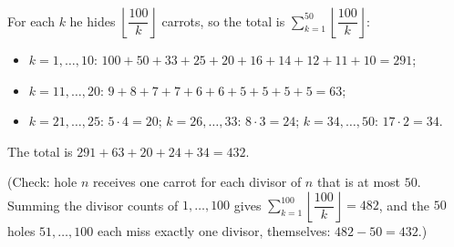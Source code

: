 For each $k$ he hides $\left\lfloor\dfrac{100}{k}\right\rfloor$ carrots, so the total is $\displaystyle\sum_{k=1}^{50}\left\lfloor\dfrac{100}{k}\right\rfloor$:
\begin{itemize}
\item $k=1,\dots,10$: $100+50+33+25+20+16+14+12+11+10=291$;
\item $k=11,\dots,20$: $9+8+7+7+6+6+5+5+5+5=63$;
\item $k=21,\dots,25$: $5\cdot4=20$; $k=26,\dots,33$: $8\cdot3=24$; $k=34,\dots,50$: $17\cdot2=34$.
\end{itemize}
The total is $291+63+20+24+34=\boxed{432}$.

(Check: hole $n$ receives one carrot for each divisor of $n$ that is at most $50$. Summing the divisor counts of $1,\dots,100$ gives $\sum_{k=1}^{100}\left\lfloor\dfrac{100}k\right\rfloor=482$, and the $50$ holes $51,\dots,100$ each miss exactly one divisor, themselves: $482-50=432$.)
